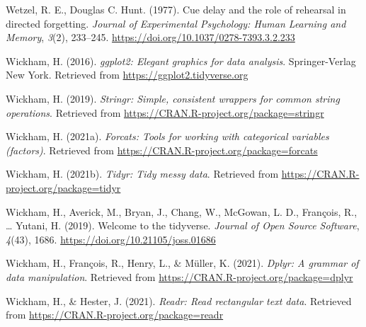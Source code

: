 \documentclass[
  man,floatsintext]{apa6}
\newlength{\cslhangindent}
\newlength{\cslentryspacingunit} %
\newenvironment{CSLReferences}[2] %
 {%
  \setlength{\parindent}{0pt}
  \ifodd #1
  \let\oldpar\par
  \def\par{\hangindent=\cslhangindent\oldpar}
  \fi
  \setlength{\parskip}{#2\cslentryspacingunit}
 }%
 {}
\begin{document}
\begin{CSLReferences}{1}{0}
\leavevmode{}%
Wetzel, R. E., Douglas C. Hunt. (1977). Cue delay and the role of rehearsal in directed forgetting. \emph{Journal of Experimental Psychology: Human Learning and Memory}, \emph{3}(2), 233--245. \url{https://doi.org/10.1037/0278-7393.3.2.233}

\leavevmode{}%
Wickham, H. (2016). \emph{ggplot2: Elegant graphics for data analysis}. Springer-Verlag New York. Retrieved from \url{https://ggplot2.tidyverse.org}

\leavevmode{}%
Wickham, H. (2019). \emph{Stringr: Simple, consistent wrappers for common string operations}. Retrieved from \url{https://CRAN.R-project.org/package=stringr}

\leavevmode{}%
Wickham, H. (2021a). \emph{Forcats: Tools for working with categorical variables (factors)}. Retrieved from \url{https://CRAN.R-project.org/package=forcats}

\leavevmode{}%
Wickham, H. (2021b). \emph{Tidyr: Tidy messy data}. Retrieved from \url{https://CRAN.R-project.org/package=tidyr}

\leavevmode{}%
Wickham, H., Averick, M., Bryan, J., Chang, W., McGowan, L. D., François, R., \ldots{} Yutani, H. (2019). Welcome to the {tidyverse}. \emph{Journal of Open Source Software}, \emph{4}(43), 1686. \url{https://doi.org/10.21105/joss.01686}

\leavevmode{}%
Wickham, H., François, R., Henry, L., \& Müller, K. (2021). \emph{Dplyr: A grammar of data manipulation}. Retrieved from \url{https://CRAN.R-project.org/package=dplyr}

\leavevmode{}%
Wickham, H., \& Hester, J. (2021). \emph{Readr: Read rectangular text data}. Retrieved from \url{https://CRAN.R-project.org/package=readr}

\end{CSLReferences}

\endgroup
\end{document}
